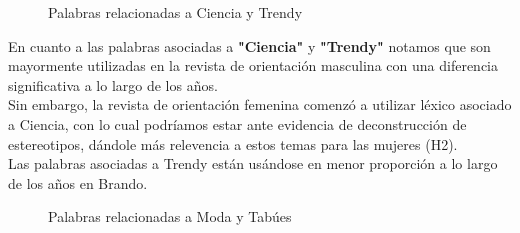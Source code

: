\documentclass[a4paper]{article}
\begin{document}
\begin{figure}[H]
\centering
{}
\caption{Palabras relacionadas a Ciencia y Trendy} \label{fig:cienciaytrendy}
\end{figure}

En cuanto a las palabras asociadas a \textbf{"Ciencia"} y \textbf{"Trendy"} notamos que son mayormente utilizadas en la revista de orientaci\'on masculina con una diferencia significativa a lo largo de los a\~nos.\\
Sin embargo, la revista de orientaci\'on femenina comenz\'o a utilizar l\'exico asociado a Ciencia, con lo cual podr\'iamos estar ante evidencia de deconstrucci\'on de estereotipos, d\'andole m\'as relevencia a estos temas para las mujeres (H2).\\
Las palabras asociadas a Trendy est\'an us\'andose en menor proporci\'on a lo largo de los a\~nos en Brando.

\begin{figure}[H]
\centering
{}
\caption{Palabras relacionadas a Moda y Tab\'ues} \label{fig:modaytabu}
\end{figure}
\end{document}
